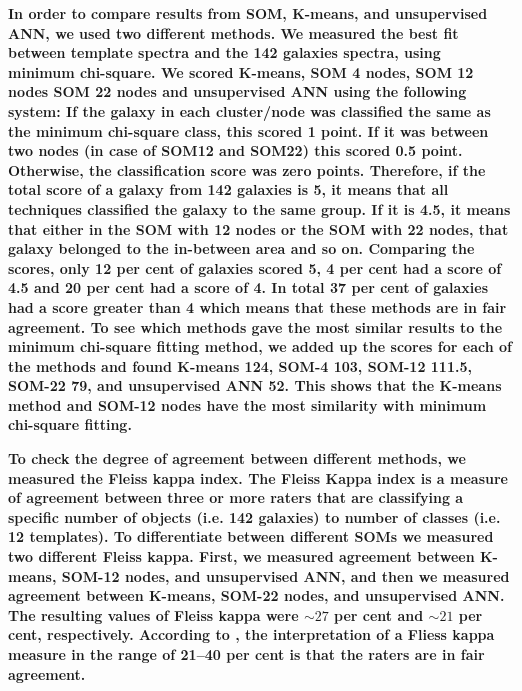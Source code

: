         \textbf{In order to compare results from SOM, K-means, and unsupervised ANN, we used two different methods.
        We measured the best fit between  template spectra and the  142 galaxies spectra, using minimum chi-square.
        We scored K-means, SOM 4 nodes, SOM 12 nodes SOM 22 nodes and unsupervised ANN using the following system:
        If the galaxy in each cluster/node was classified the same as the minimum chi-square class, this scored 1 point. 
        If it was between two nodes (in case of SOM12 and SOM22) this scored 0.5 point. 
        Otherwise, the classification score was zero points. 
        Therefore, if the total score of a galaxy from 142 galaxies is 5, it means that all techniques classified the galaxy to the same group.
        If it is 4.5, it means that either in the SOM with 12 nodes or the SOM with 22 nodes, that galaxy belonged to the in-between area and so on.
        Comparing the scores, only 12 per cent of galaxies scored 5, 4 per cent had a score of 4.5 and 20 per cent had a score of 4.
        In total 37 per cent of galaxies had a score greater than 4 which means that these methods are in fair agreement.
        To see which methods gave the most similar results to the minimum chi-square fitting method, we added up the scores for each of the methods and found K-means 124, SOM-4 103, SOM-12 111.5, SOM-22 79, and unsupervised ANN 52.
        This shows that the K-means method and SOM-12 nodes have the most similarity with minimum chi-square fitting.}
        
        
        \textbf{To check the degree of agreement between different methods, we measured the Fleiss kappa index. 
        The Fleiss Kappa index is a measure of agreement between three or more raters that are classifying a specific number of objects (i.e. 142 galaxies) to number of classes (i.e. 12 templates).
        To differentiate between different SOMs we measured two different Fleiss kappa. First, we measured agreement between K-means, SOM-12 nodes, and unsupervised ANN, and then we measured agreement between K-means, SOM-22 nodes, and unsupervised ANN.
        The resulting values of Fleiss kappa were $\sim 27$ per cent and $\sim 21$ per cent, respectively.
        According to \citep{landis77}, the interpretation of a Fliess kappa measure in the range of 21--40 per cent is that the raters are in fair agreement.
        }

